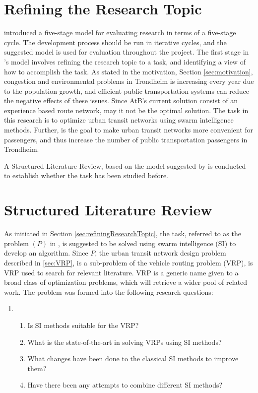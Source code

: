 
\section{Refining the Research Topic}
\label{sec:refiningResearchTopic}
\citet{cohen88} introduced a five-stage model for evaluating research in terms of a five-stage cycle. The development process should be run in iterative cycles, and the suggested model is used for evaluation throughout the project. The first stage in \citet{cohen88}'s model involves refining the research topic to a task, and identifying a view of how to accomplish the task. %
As stated in the motivation, Section \vref{sec:motivation}, congestion and environmental problems in Trondheim is increasing every year due to the population growth\citep{website:miljopakken}, and efficient public transportation systems can reduce the negative effects of these issues. Since AtB's\citep{website:atb} current solution consist of an experience based route network, may it not be the optimal solution. The task in this research is to optimize urban transit networks using swarm intelligence methods. Further, is the goal to make urban transit networks more convenient for passengers, and thus increase the number of public transportation passengers in Trondheim. 

A Structured Literature Review, based on the model suggested by \citet{kofod2014} is conducted to establish whether the task has been studied before. 

\section{Structured Literature Review}
\label{sec:structuredLiteratureReview}

As initiated in Section \vref{sec:refiningResearchTopic}, the task, referred to as the problem $(P)$ in \citet{kofod2014}, is suggested to be solved using swarm intelligence (SI) to develop an algorithm. Since $P$, the urban transit network design problem described in \vref{sec:VRP}, is a sub-problem of the vehicle routing problem (VRP), is VRP used to search for relevant literature. VRP is a generic name given to a broad class of optimization problems, which will retrieve a wider pool of related work. The problem was formed into the following research questions:

\begin{enumerate}[label=\textbf{\arabic*})]
\item 
    \begin{enumerate}
    \item Is SI methods suitable for the VRP?
    \item What is the state-of-the-art in solving VRPs using SI methods?
    \item What changes have been done to the classical SI methods to improve them?
    \item Have there been any attempts to combine different SI methods?
    \end{enumerate}
\end{enumerate}

